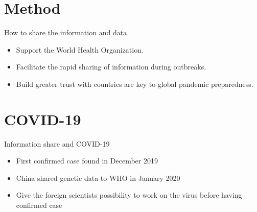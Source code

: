 \documentclass{beamer}
\begin{document}
\section{Method}
\begin{frame}{How to share the information and data}
\begin{itemize}

\item Support the World Health Organization.
\item Facilitate the rapid sharing of information during outbreaks.
\item Build greater trust with countries are key to global pandemic preparedness.
\citep{sciencedaily_2017}
\end{itemize}
\end{frame}


\section{COVID-19}
\begin{frame}{Information share and COVID-19}
\begin{itemize}

\item First confirmed case found in December 2019
\item China shared genetic data to WHO in January 2020
\item Give the foreign scientists possibility to work on the virus before having confirmed case
\citep{lisa}

\end{itemize}
\end{frame}
\end{document}
